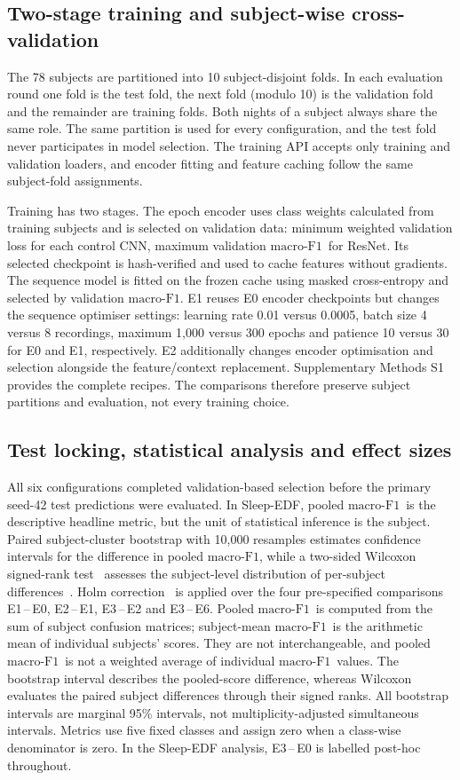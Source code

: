 \documentclass[11pt,a4paper]{article}
\newcommand{\mf}{\ensuremath{\mathrm{macro\text{-}F1}}}
\begin{document}
\subsection{Two-stage training and subject-wise cross-validation}

The 78 subjects are partitioned into 10 subject-disjoint folds. In each evaluation round one fold is the
test fold, the next fold (modulo 10) is the validation fold and the remainder are training folds. Both
nights of a subject always share the same role. The same partition is used for every configuration, and
the test fold never participates in model selection. The training API accepts only training and
validation loaders, and encoder fitting and feature caching follow the same subject-fold assignments.

Training has two stages. The epoch encoder uses class weights calculated from training subjects and
is selected on validation data: minimum weighted validation loss for each control CNN, maximum
validation \mf\ for ResNet. Its selected checkpoint is hash-verified and used to cache features
without gradients. The sequence model is fitted on the frozen cache using masked cross-entropy and
selected by validation \mf. E1 reuses E0 encoder checkpoints but changes the sequence optimiser
settings: learning rate 0.01 versus 0.0005, batch size 4 versus 8 recordings, maximum 1{,}000 versus
300 epochs and patience 10 versus 30 for E0 and E1, respectively. E2 additionally changes encoder
optimisation and selection alongside the feature/context replacement. Supplementary Methods S1
provides the complete recipes. The comparisons therefore preserve subject partitions and evaluation,
not every training choice.

\subsection{Test locking, statistical analysis and effect sizes}

All six configurations completed validation-based selection before the primary seed-42 test predictions
were evaluated. In
Sleep-EDF, pooled \mf\ is the descriptive headline metric, but the unit of statistical inference is the
subject. Paired subject-cluster bootstrap with 10{,}000 resamples estimates confidence intervals for the
difference in pooled \mf, while a two-sided Wilcoxon signed-rank test~\cite{wilcoxon1945} assesses the
subject-level distribution of per-subject differences~\cite{efron1994bootstrap}. Holm
correction~\cite{holm1979} is applied over the four pre-specified comparisons E1\,--\,E0, E2\,--\,E1,
E3\,--\,E2 and E3\,--\,E6. Pooled \mf\ is computed from the sum of subject confusion matrices;
subject-mean \mf\ is the arithmetic mean of individual subjects' scores. They are not interchangeable,
and pooled \mf\ is not a weighted average of individual \mf\ values. The bootstrap interval describes
the pooled-score difference, whereas Wilcoxon evaluates the paired subject differences through their
signed ranks. All bootstrap intervals are marginal 95\% intervals, not multiplicity-adjusted simultaneous
intervals. Metrics use five fixed classes and assign zero when a class-wise denominator is zero.
In the Sleep-EDF analysis, E3\,--\,E0 is labelled post-hoc throughout.
\end{document}
